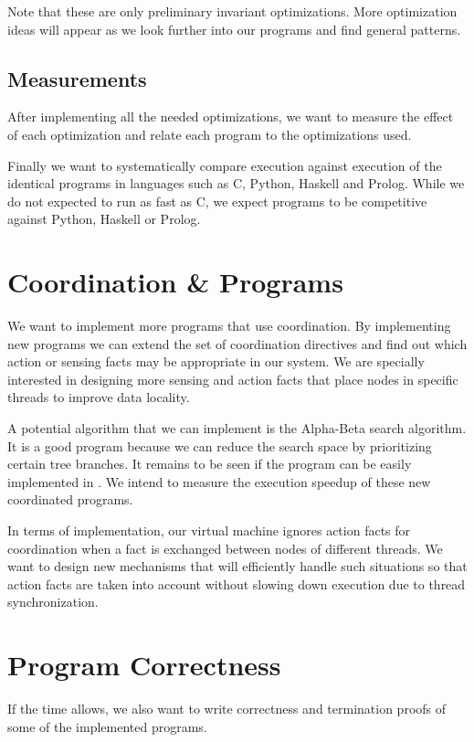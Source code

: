 Note that these are only preliminary invariant optimizations. More optimization ideas will appear
as we look further into our programs and find general patterns.

\subsection{Measurements}

After implementing all the needed optimizations, we want to measure the effect of each optimization
and relate each program to the optimizations used.

Finally we want to systematically compare \lang execution against execution of the identical programs
in languages such as C, Python, Haskell and Prolog. While we do not expected to run as fast as C,
we expect \lang programs to be competitive against Python, Haskell or Prolog.

\section{Coordination \& Programs}

We want to implement more programs that use coordination. By implementing new programs we can
extend the set of coordination directives and find out which action or sensing facts may be
appropriate in our system. We are specially interested in designing more sensing and action
facts that place nodes in specific threads to improve data locality.

A potential algorithm that we can implement is the Alpha-Beta search algorithm. It is a good program
because we can reduce the search space by prioritizing certain tree branches. It remains to be
seen if the program can be easily implemented in \lang.
We intend to measure the execution speedup of these new coordinated programs.

In terms of implementation, our virtual machine ignores action facts for coordination when a fact
is exchanged between nodes of different threads. We want to design new mechanisms
that will efficiently handle such situations so that action facts are taken into account without
slowing down execution due to thread synchronization.

\section{Program Correctness}

If the time allows, we also want to write correctness and termination proofs of some of the implemented \lang programs.

